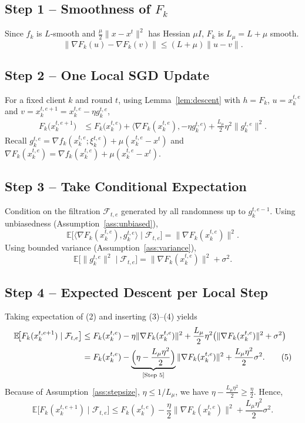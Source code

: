 \documentclass[11pt]{article}
\newcommand{\E}{\mathbb{E}}
\begin{document}
\subsection*{Step 1 – Smoothness of $F_k$}
Since $f_k$ is $L$‑smooth and $\frac{\mu}{2}\|x-x^{t}\|^{2}$ has Hessian $\mu I$, $F_k$ is $L_{\mu}=L+\mu$ smooth.  
\[
    \|\nabla F_k(u)-\nabla F_k(v)\|\le (L+\mu)\|u-v\|.\tag{1}
\]  

\subsection*{Step 2 – One Local SGD Update}
For a fixed client $k$ and round $t$, using Lemma~\ref{lem:descent} with $h=F_k$, $u=x_{k}^{t,e}$ and $v=x_{k}^{t,e+1}=x_{k}^{t,e}-\eta g_{k}^{t,e}$,
\begin{align}
    F_k\!\bigl(x_{k}^{t,e+1}\bigr)
    &\le F_k\!\bigl(x_{k}^{t,e}\bigr)
      +\langle\nabla F_k(x_{k}^{t,e}), -\eta g_{k}^{t,e}\rangle
      +\frac{L_{\mu}}{2}\eta^{2}\|g_{k}^{t,e}\|^{2}. \tag{2}
\end{align}
Recall $g_{k}^{t,e}= \nabla f_k(x_{k}^{t,e};\xi_{k}^{t,e})+\mu(x_{k}^{t,e}-x^{t})$ and $\nabla F_k(x_{k}^{t,e})=\nabla f_k(x_{k}^{t,e})+\mu(x_{k}^{t,e}-x^{t})$.  

\subsection*{Step 3 – Take Conditional Expectation}
Condition on the filtration $\mathcal{F}_{t,e}$ generated by all randomness up to $g_{k}^{t,e-1}$. Using unbiasedness (Assumption~\ref{ass:unbiased}),
\[
    \E\!\bigl[\langle\nabla F_k(x_{k}^{t,e}),g_{k}^{t,e}\rangle\mid\mathcal{F}_{t,e}\bigr]
    =\|\nabla F_k(x_{k}^{t,e})\|^{2}. \tag{3}
\]
Using bounded variance (Assumption~\ref{ass:variance}),
\[
    \E\!\bigl[\|g_{k}^{t,e}\|^{2}\mid\mathcal{F}_{t,e}\bigr]
    =\|\nabla F_k(x_{k}^{t,e})\|^{2}+\sigma^{2}. \tag{4}
\]

\subsection*{Step 4 – Expected Descent per Local Step}
Taking expectation of (2) and inserting (3)–(4) yields
\begin{align}
    \E\!\bigl[F_k(x_{k}^{t,e+1})\mid\mathcal{F}_{t,e}\bigr]
    &\le F_k(x_{k}^{t,e})-\eta\|\nabla F_k(x_{k}^{t,e})\|^{2}
      +\frac{L_{\mu}}{2}\eta^{2}\bigl(\|\nabla F_k(x_{k}^{t,e})\|^{2}+\sigma^{2}\bigr) \nonumber\\
    &=
      F_k(x_{k}^{t,e})-\underbrace{\Bigl(\eta-\frac{L_{\mu}\eta^{2}}{2}\Bigr)}_{\text{[Step 5]}}\|\nabla F_k(x_{k}^{t,e})\|^{2}
      +\frac{L_{\mu}\eta^{2}}{2}\sigma^{2}. \tag{5}
\end{align}
Because of Assumption~\ref{ass:stepsize}, $\eta\le 1/L_{\mu}$, we have $\eta-\frac{L_{\mu}\eta^{2}}{2}\ge\frac{\eta}{2}$. Hence,
\[
    \E\!\bigl[F_k(x_{k}^{t,e+1})\mid\mathcal{F}_{t,e}\bigr]
    \le
    F_k(x_{k}^{t,e})-\frac{\eta}{2}\|\nabla F_k(x_{k}^{t,e})\|^{2}
    +\frac{L_{\mu}\eta^{2}}{2}\sigma^{2}. \tag{6}
\]
\end{document}
